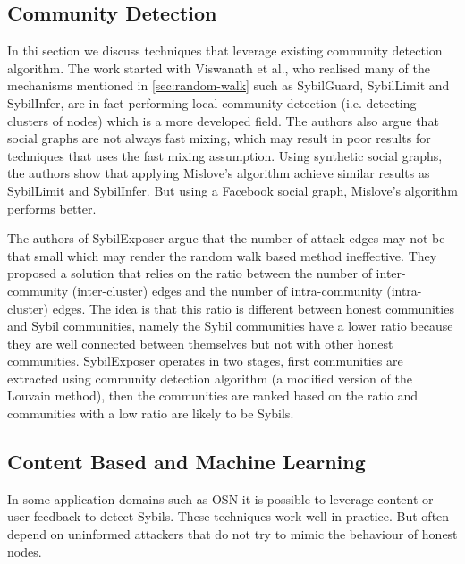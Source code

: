 
\subsection{Community Detection}
In thi section we discuss techniques that leverage existing community detection
algorithm. The work started with Viswanath et al., who realised many of the
mechanisms mentioned in \autoref{sec:random-walk} such as SybilGuard, SybilLimit
and SybilInfer, are in fact performing local community detection (i.e. detecting
clusters of nodes) which is a more developed field\cite{viswanath2010analysis}.
The authors also argue that social graphs are not always fast mixing, which may
result in poor results for techniques that uses the fast mixing assumption.
Using synthetic social graphs, the authors show that applying Mislove's
algorithm\cite{mislove2010you} achieve similar results as SybilLimit and
SybilInfer. But using a Facebook social graph, Mislove's algorithm performs
better.

The authors of SybilExposer\cite{misra2016sybilexposer} argue that the number of
attack edges may not be that small which may render the random walk based method
ineffective. They proposed a solution that relies on the ratio between the
number of inter-community (inter-cluster) edges and the number of
intra-community (intra-cluster) edges. The idea is that this ratio is different
between honest communities and Sybil communities, namely the Sybil communities have
a lower ratio because they are well connected between themselves but not with
other honest communities. SybilExposer operates in two stages, first communities
are extracted using community detection algorithm (a modified version of the
Louvain method\cite{blondel2008fast}), then the communities are ranked based on the
ratio and communities with a low ratio are likely to be Sybils.


\subsection{Content Based and Machine Learning}
In some application domains such as OSN it is possible to leverage content or
user feedback to detect Sybils. These techniques work well in practice. But
often depend on uninformed attackers that do not try to mimic the behaviour of
honest nodes.

